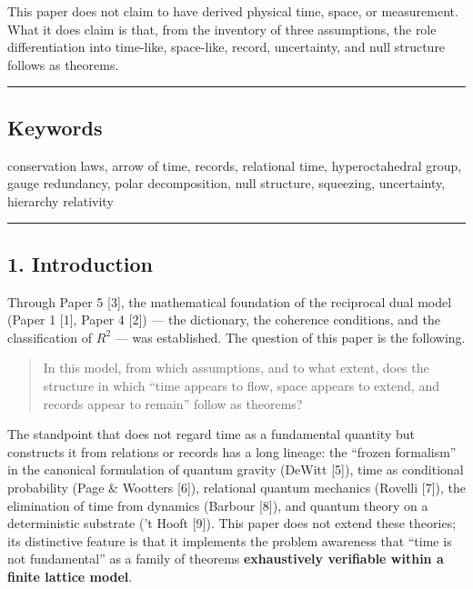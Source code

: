 \documentclass[
]{ltjsarticle}
\begin{document}
This paper does not claim to have derived physical time, space, or
measurement. What it does claim is that, from the inventory of three
assumptions, the role differentiation into time-like, space-like,
record, uncertainty, and null structure follows as theorems.

\begin{center}\rule{0.5\linewidth}{0.5pt}\end{center}

\subsection{Keywords}\label{keywords}

conservation laws, arrow of time, records, relational time,
hyperoctahedral group, gauge redundancy, polar decomposition, null
structure, squeezing, uncertainty, hierarchy relativity

\begin{center}\rule{0.5\linewidth}{0.5pt}\end{center}

\subsection{1. Introduction}\label{introduction}

Through Paper 5 {[}3{]}, the mathematical foundation of the reciprocal
dual model (Paper 1 {[}1{]}, Paper 4 {[}2{]}) --- the dictionary, the
coherence conditions, and the classification of \(R^2\) --- was
established. The question of this paper is the following.

\begin{quote}
In this model, from which assumptions, and to what extent, does the
structure in which ``time appears to flow, space appears to extend, and
records appear to remain'' follow as theorems?
\end{quote}

The standpoint that does not regard time as a fundamental quantity but
constructs it from relations or records has a long lineage: the ``frozen
formalism'' in the canonical formulation of quantum gravity (DeWitt
{[}5{]}), time as conditional probability (Page \& Wootters {[}6{]}),
relational quantum mechanics (Rovelli {[}7{]}), the elimination of time
from dynamics (Barbour {[}8{]}), and quantum theory on a deterministic
substrate ('t Hooft {[}9{]}). This paper does not extend these theories;
its distinctive feature is that it implements the problem awareness that
``time is not fundamental'' as a family of theorems \textbf{exhaustively
verifiable within a finite lattice model}.
\end{document}
